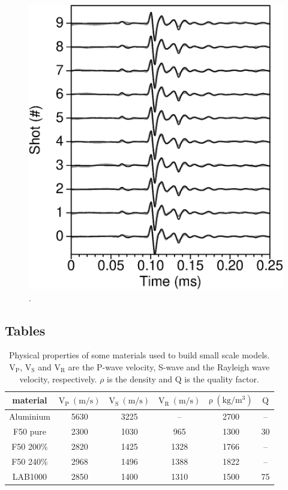 \documentclass[manuscript,revised]{geophysics}
\begin{document}
\begin{figure}[!h]
	\centering
	\includegraphics[scale=1.0]{fig/F50_CT_all.eps}
	\caption{.}
	\label{panel_srcest_2d_mean_comp}
\end{figure}

\clearpage
\newpage

\subsection*{Tables}

\begin{table}[!ht]
	\centering
	\begin{tabular}{cccccc}
		\hline
		material & $\mathrm{V_{P}\ (m/s)}$ & $\mathrm{V_{S}\ (m/s)}$ & $\mathrm{V_{R}\ (m/s)}$ & $\mathrm{\rho\ (kg/m^{3})}$ & $\mathrm{Q}$ \\
		\hline
		Aluminium & 5630 & 3225 & --   & 2700 & --  \\
		F50 pure  & 2300 & 1030 & 965  & 1300 & 30  \\
		F50 200\% & 2820 & 1425 & 1328 & 1766 & --  \\
		F50 240\% & 2968 & 1496 & 1388 & 1822 & --  \\
		LAB1000   & 2850 & 1400 & 1310 & 1500 & 75  \\
		\hline
	\end{tabular}
	\caption{Physical properties of some materials used to build small scale models. $\mathrm{V_{P}}$, $\mathrm{V_{S}}$ and $\mathrm{V_{R}}$ are the P-wave velocity, S-wave and the Rayleigh wave velocity, respectively. $\rho$ is the density and $\mathrm{Q}$ is the quality factor.}
	\label{epoxy-resin}
\end{table}
\end{document}
